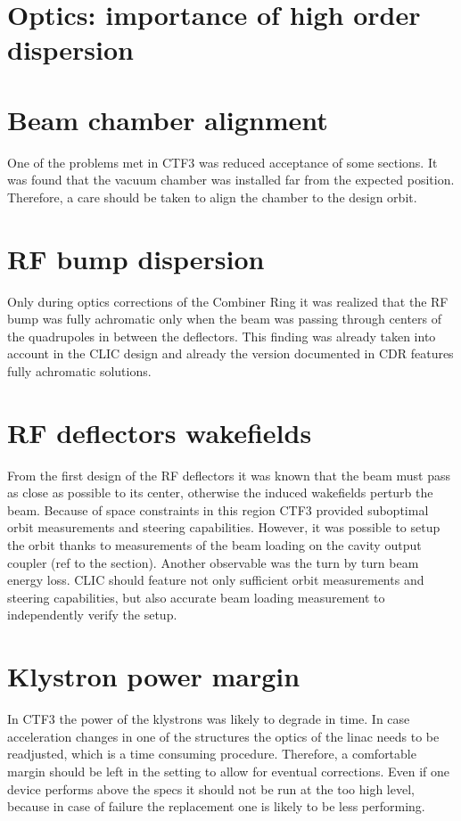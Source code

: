  
\section{Optics: importance of high order dispersion} 

 
\section{Beam chamber alignment} 

One of the problems met in CTF3 was reduced acceptance of some sections. 
It was found that the vacuum chamber was installed far from the expected position.
Therefore, a care should be taken to align the chamber to the design orbit.

 
\section{RF bump dispersion} 

Only during optics corrections of the Combiner Ring it was realized that 
the RF bump was fully achromatic only when the beam was passing through centers 
of the quadrupoles in between the deflectors. 
This finding was already taken into account in the CLIC design and already the version
documented in CDR features fully achromatic solutions.

\section{RF deflectors wakefields}

From the first design of the RF deflectors it was known that the beam must pass as close 
as possible to its center, otherwise the induced wakefields perturb the beam. 
Because of space constraints in this region CTF3 provided suboptimal orbit measurements and 
steering capabilities. However, it was possible to setup the orbit thanks to 
measurements of the beam loading on the cavity output coupler (ref to the section).
Another observable was the turn by turn beam energy loss. 
CLIC should feature not only sufficient orbit measurements and steering capabilities,
but also accurate beam loading measurement to independently verify the setup.



\section{Klystron power margin}   
 
In CTF3 the power of the klystrons was likely to degrade in time. 
In case acceleration changes in one of the structures the optics of the linac needs to be readjusted,
which is a time consuming procedure. Therefore, a comfortable margin should be left in the setting
to allow for eventual corrections. Even if one device performs above the specs
it should not be run at the too high level, because in case of failure the replacement 
one is likely to be less performing.

  
